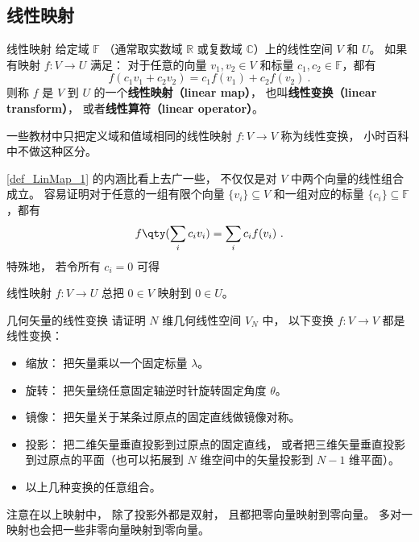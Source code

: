 
\begin{issues}
\end{issues}



\subsection{线性映射}
\begin{definition}{线性映射}\label{def_LinMap_1}
给定域 $\mathbb F$ （通常取实数域 $\mathbb R$ 或复数域 $\mathbb C$）上的线性空间 $V$ 和 $U$。 如果有映射 $f:V\rightarrow U$ 满足： 对于任意的向量 ${v}_1, {v}_2\in V$ 和标量 $c_1, c_2 \in \mathbb{F}$，都有
\begin{equation}
f(c_1 {v}_1+c_2 {v}_2)=c_1f({v}_1)+c_2f({v}_2)~.
\end{equation}
则称 $f$ 是 $V$ 到 $U$ 的一个\textbf{线性映射（linear map）}， 也叫\textbf{线性变换（linear transform）}， 或者\textbf{线性算符（linear operator）}。
\end{definition}
一些教材中只把定义域和值域相同的线性映射 $f:V\to V$ 称为线性变换， 小时百科中不做这种区分。

\autoref{def_LinMap_1} 的内涵比看上去广一些， 不仅仅是对 $V$ 中两个向量的线性组合成立。 容易证明对于任意的一组有限个向量 $\{{v}_i\}\subseteq V$ 和一组对应的标量 $\{c_i\}\subseteq\mathbb{F}$，都有
\begin{equation}\label{eq_LinMap_1}
f\qty(\sum_i c_i {v}_i)=\sum_i c_i f({v}_i)~.
\end{equation}
特殊地， 若令所有 $c_i = 0$ 可得
\begin{corollary}{}\label{cor_LinMap_1}
线性映射 $f:V\to U$ 总把 $0 \in V$ 映射到 $0 \in U$。
\end{corollary}

\begin{exercise}{几何矢量的线性变换}
请证明 $N$ 维几何线性空间 $V_N$ 中， 以下变换 $f:V\to V$ 都是线性变换：
\begin{itemize}
\item 缩放： 把矢量乘以一个固定标量 $\lambda$。
\item 旋转： 把矢量绕任意固定轴逆时针旋转固定角度 $\theta$。
\item 镜像： 把矢量关于某条过原点的固定直线做镜像对称。
\item 投影： 把二维矢量垂直投影到过原点的固定直线， 或者把三维矢量垂直投影到过原点的平面（也可以拓展到 $N$ 维空间中的矢量投影到 $N-1$ 维平面）。
\item 以上几种变换的任意组合。
\end{itemize}
\end{exercise}
注意在以上映射中， 除了投影外都是双射， 且都把零向量映射到零向量。 多对一映射也会把一些非零向量映射到零向量。

